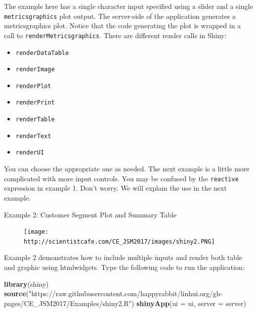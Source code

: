\documentclass[]{book}
\newenvironment{Shaded}{\begin{snugshade}}{\end{snugshade}}
\newcommand{\KeywordTok}[1]{\textcolor[rgb]{0.13,0.29,0.53}{\textbf{{#1}}}}
\newcommand{\DataTypeTok}[1]{\textcolor[rgb]{0.13,0.29,0.53}{{#1}}}
\newcommand{\StringTok}[1]{\textcolor[rgb]{0.31,0.60,0.02}{{#1}}}
\newcommand{\CommentTok}[1]{\textcolor[rgb]{0.56,0.35,0.01}{\textit{{#1}}}}
\newcommand{\NormalTok}[1]{{#1}}
\providecommand{\tightlist}{%
  \setlength{\itemsep}{0pt}\setlength{\parskip}{0pt}}
\theoremstyle{definition}
\theoremstyle{definition}
\theoremstyle{remark}
\begin{document}
\begin{Shaded}
\begin{Highlighting}[]
{{{\NormalTok{\}}

\CommentTok{# Run the application }
 \KeywordTok{shinyApp}\NormalTok{(}\DataTypeTok{ui =} \NormalTok{ui, }\DataTypeTok{server =} \NormalTok{server)}
\end{Highlighting}
\end{Shaded}

The example here has a single character input specified using a slider
and a single \texttt{metricsgraphics} plot output. The server-side of
the application generates a metricsgraphics plot. Notice that the code
generating the plot is wrapped in a call to
\texttt{renderMetricsgraphics}. There are different render calls in
Shiny:

\begin{itemize}
\tightlist
\item
  \texttt{renderDataTable}
\item
  \texttt{renderImage}
\item
  \texttt{renderPlot}
\item
  \texttt{renderPrint}
\item
  \texttt{renderTable}
\item
  \texttt{renderText}
\item
  \texttt{renderUI}
\end{itemize}

You can choose the appropriate one as needed. The next example is a
little more complicated with more input controls. You may be confused by
the \texttt{reactive} expression in example 1. Don't worry. We will
explain the use in the next example.

 Example 2: Customer Segment Plot and Summary Table

\begin{figure}[htbp]
\centering
\texttt{[image: http://scientistcafe.com/CE\_JSM2017/images/shiny2.PNG]}
\caption{}
\end{figure}

Example 2 demonstrates how to include multiple inputs and render both
table and graphic using htmlwidgets. Type the following code to run the
application:

\begin{Shaded}
\begin{Highlighting}[]
\KeywordTok{library}\NormalTok{(shiny)}
\KeywordTok{source}\NormalTok{(}\StringTok{"https://raw.githubusercontent.com/happyrabbit/linhui.org/gh-pages/CE_JSM2017/Examples/shiny2.R"}\NormalTok{)}
\KeywordTok{shinyApp}\NormalTok{(}\DataTypeTok{ui =} \NormalTok{ui, }\DataTypeTok{server =} \NormalTok{server)}
\end{Highlighting}
\end{Shaded}
\end{document}
